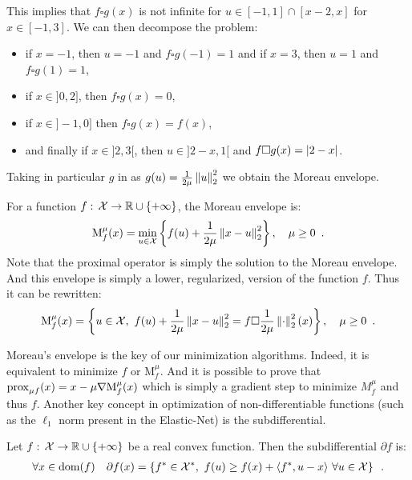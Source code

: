 \documentclass[../main.tex]{subfiles}
\begin{document}
This implies that $f\square g(x)$ is not infinite for
$u\in [-1, 1]\cap [x-2, x]$ \ie for $x \in [-1, 3]$.
We can then decompose the problem:
\begin{itemize}
    \item if $x=-1$, then $u=-1$ and $f\square g(-1)=1$ and if $x=3$,
	then $u=1$ and $f\square g(1)=1$,
    \item if $x\in ]0, 2]$, then $f\square g(x) = 0$,
    \item if $x\in ]-1, 0]$ then $f\square g(x) = f(x)$,
    \item and finally if $x\in ]2, 3[$, then $u\in ]2-x, 1[$ and
	$f\square g(x) = \left \vert 2-x \right \vert$.
\end{itemize}

Taking in particular $g$ in  as
$g(u)=\frac{1}{2\mu}\left \lVert u \right \rVert_2^2$ we obtain the Moreau envelope.

\begin{definition}
	For a function $f:\,\mathcal{X}\rightarrow \mathbb{R}\cup\{+\infty\}$, the Moreau envelope
	is:
	\begin{align}
	\mathrm{M}_f^\mu(x)
	= \min_{u\in \mathcal{X}} \left\{ f(u) + \frac{1}{2\mu}\left \lVert x-u \right \rVert_2^2\right\},
	\quad \mu\geq 0\enspace.
	\end{align}
Note that the proximal operator is simply the solution to the Moreau
envelope.
And this envelope is simply a lower, regularized, version of the
function $f$.
Thus it can be rewritten:
	\begin{align}
	\mathrm{M}_f^\mu(x)
	= \left\{ u\in \mathcal{X},\ f(u) + \frac{1}{2\mu}\left \lVert x-u \right \rVert_2^2
	= f\square \frac{1}{2\mu}\left \lVert \cdot \right \rVert_2^2(x)\right\},
	\quad \mu\geq 0\enspace.
	\end{align}
\end{definition}
Moreau's envelope is the key of our minimization algorithms.
Indeed, it is equivalent to minimize $f$ or $\mathrm{M}_f^\mu$.
And it is possible to prove \citep[chapter 6]{Beck17} that
$\operatorname{prox}_{\mu f}(x) = x - \mu\nabla \mathrm{M}_f^\mu(x)$ which is simply a
gradient step to minimize $M_f^\mu$ and thus $f$.
Another key concept in optimization of non-differentiable functions
(such as the $\ell_1$ norm present in the Elastic-Net) is the subdifferential.
\begin{definition}
	Let $f:\,\mathcal{X}\rightarrow \mathbb{R}\cup\{+\infty\}$ be a real convex function.
	Then the subdifferential $\partial f$ is:
	\begin{align}\label{def:subdif}
		\forall x\in\operatorname{dom}(f)\quad
		\partial f(x) = \left\{ f^* \in \mathcal{X}^*,\ f(u) \geq f(x) +
		\langle f^*, u-x\rangle\ \forall u\in \mathcal{X}\right\}
		\enspace.
	\end{align}
\end{definition}
\end{document}
